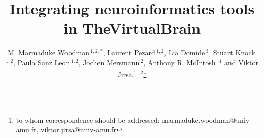 \documentclass{bioinfo}
\begin{document}


\title[The Virtual Brain]{Integrating neuroinformatics tools in TheVirtualBrain}
\author[Woodman {et~al}]{
        M. Marmaduke Woodman\,$^{1,2,*}$,  
        Laurent Pezard\,$^{1,2}$,  
        Lia Domide\,$^{3}$, 
        Stuart Knock\,$^{1,2}$, 
        Paula Sanz Leon\,$^{1,2}$, 
        Jochen Mersmann\,$^{2}$,
        Anthony R. McIntosh \,$^{4}$ and  
        Viktor Jirsa\,$^{1,,2}$\footnote{to whom correspondence should be addressed: marmaduke.woodman@univ-amu.fr,
        viktor.jirsa@univ-amu.fr}}

\address{$^{1}$ Institut National de la Sant\'{e} et de la Recherche M\'{e}dicale UMR 1106, Institut de Neurosciences des Syst\`{e}mes, 13385 Marseille, France.\\
	 $^{2}$ Aix-Marseille Universit\'{e}, 13284 Marseille, France.\\
         $^{3}$ CodeBox GmbH, Hugo Eckener Str. 7, 70184 Stuttgart, Germany.\\
         $^{4}$ Codemart, 13, Petofi Sandor, 400610, Cluj-Napoca, Romania.\\
         $^{5}$ Rotman Research Institute at Baycrest, Toronto, M6A 2E1, Ontario, Canada\\
        }

\history{}

\editor{}

\maketitle
\end{document}
